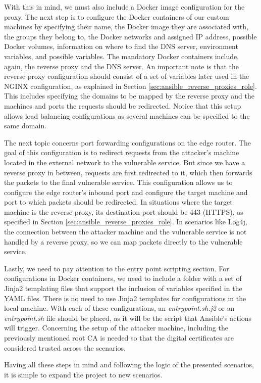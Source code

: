 With this in mind, we must also include a Docker image configuration for the proxy. The next step is to configure the Docker containers of our custom machines by specifying their name, the Docker image they are associated with, the groups they belong to, the Docker networks and assigned IP address, possible Docker volumes, information on where to find the DNS server, environment variables, and possible variables. The mandatory Docker containers include, again, the reverse proxy and the DNS server. An important note is that the reverse proxy configuration should consist of a set of variables later used in the NGINX configuration, as explained in Section \ref{sec:ansible_reverse_proxies_role}. This includes specifying the domains to be mapped by the reverse proxy and the machines and ports the requests should be redirected. Notice that this setup allows load balancing configurations as several machines can be specified to the same domain. 

The next topic concerns port forwarding configurations on the edge router. The goal of this configuration is to redirect requests from the attacker's machine located in the external network to the vulnerable service. But since we have a reverse proxy in between, requests are first redirected to it, which then forwards the packets to the final vulnerable service. This configuration allows us to configure the edge router's inbound port and configure the target machine and port to which packets should be redirected. In situations where the target machine is the reverse proxy, its destination port should be 443 (HTTPS), as specified in Section \ref{sec:ansible_reverse_proxies_role}. In scenarios like Log4j, the connection between the attacker machine and the vulnerable service is not handled by a reverse proxy, so we can map packets directly to the vulnerable service.

Lastly, we need to pay attention to the entry point scripting section. For configurations in Docker containers, we need to include a folder with a set of Jinja2 templating files that support the inclusion of variables specified in the YAML files. There is no need to use Jinja2 templates for configurations in the local machine. With each of these configurations, an \textit{entrypoint.sh.j2} or an \textit{entrypoint.sh} file should be placed, as it will be the script that Ansible's actions will trigger. Concerning the setup of the attacker machine, including the previously mentioned root CA is needed so that the digital certificates are considered trusted across the scenarios.

Having all these steps in mind and following the logic of the presented scenarios, it is simple to expand the project to new scenarios.

